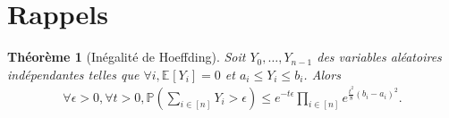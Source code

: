 \documentclass[10pt,a4paper]{article}
\theoremstyle{plain} %
\newtheorem{thm}{Théorème}
\theoremstyle{definition} %
\theoremstyle{remark} %
\newcommand{\expectation}[2]{\mathbb{E}_{#1}\left [#2\right ]}
\newcommand{\proba}[1]{\mathbb{P}\left (#1\right )}
\begin{document}
\section{Rappels}
\begin{thm}[Inégalité de Hoeffding]\label{thm:hoeffding}
Soit $Y_0, \ldots, Y_{n-1}$ des variables aléatoires indépendantes telles que $\forall i, \expectation{}{Y_i}=0$ et $a_i\leq Y_i \leq b_i$. Alors
\begin{align}
\forall \epsilon > 0, \forall t>0, \proba{\sum_{i\in\left [n\right ]}Y_i > \epsilon} \leq e^{-t\epsilon} \prod_{i\in\left [n\right ]} e^{\frac{t^2}{8}\left (b_i-a_i\right )^2}.
\end{align}
\end{thm}
\end{document}
